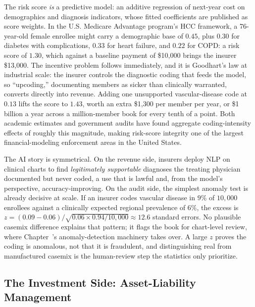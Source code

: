 \documentclass[../ai_in_finance]{subfiles}
\begin{document}
The risk score \emph{is} a predictive model: an additive regression of next-year cost on demographics and diagnosis indicators, whose fitted coefficients are published as score weights. In the U.S. Medicare Advantage program's HCC framework, a 76-year-old female enrollee might carry a demographic base of $0.45$, plus $0.30$ for diabetes with complications, $0.33$ for heart failure, and $0.22$ for COPD: a risk score of $1.30$, which against a baseline payment of \$10{,}000 brings the insurer \$13{,}000. The incentive problem follows immediately, and it is Goodhart's law at industrial scale: the insurer controls the diagnostic coding that feeds the model, so ``upcoding,'' documenting members as sicker than clinically warranted, converts directly into revenue. Adding one unsupported vascular-disease code at $0.13$ lifts the score to $1.43$, worth an extra \$1{,}300 per member per year, or \$1 billion a year across a million-member book for every tenth of a point. Both academic estimates and government audits have found aggregate coding-intensity effects of roughly this magnitude, making risk-score integrity one of the largest financial-modeling enforcement areas in the United States.

The AI story is symmetrical. On the revenue side, insurers deploy NLP on clinical charts to find \emph{legitimately supportable} diagnoses the treating physician documented but never coded, a use that is lawful and, from the model's perspective, accuracy-improving. On the audit side, the simplest anomaly test is already decisive at scale. If an insurer codes vascular disease in $9\%$ of $10{,}000$ enrollees against a clinically expected regional prevalence of $6\%$, the excess is $z = (0.09 - 0.06)/\sqrt{0.06 \times 0.94/10{,}000} \approx 12.6$ standard errors. No plausible casemix difference explains that pattern; it flags the book for chart-level review, where Chapter~'s anomaly-detection machinery takes over. A large $z$ proves the coding is anomalous, not that it is fraudulent, and distinguishing real from manufactured casemix is the human-review step the statistics only prioritize.

\subsection{The Investment Side: Asset-Liability Management}
\label{sec:ins-alm}
\end{document}
